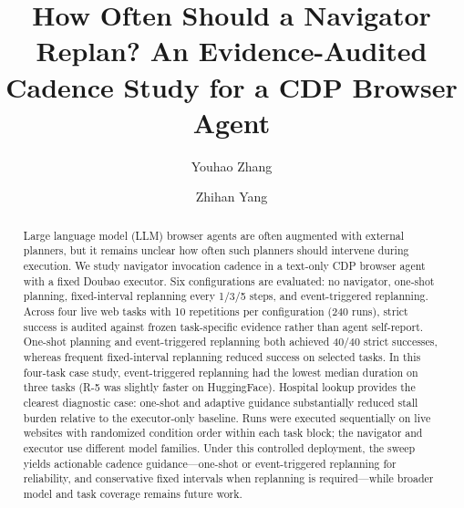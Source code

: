 \documentclass[runningheads]{llncs}
\begin{document}
\title{How Often Should a Navigator Replan? An Evidence-Audited Cadence Study for a CDP Browser Agent}

\author{Youhao Zhang  \and Zhihan Yang }


\maketitle

\begin{abstract}
Large language model (LLM) browser agents are often augmented with external
planners, but it remains unclear how often such planners should intervene during
execution. We study navigator invocation cadence in a text-only CDP browser
agent with a fixed Doubao executor. Six configurations are evaluated: no
navigator, one-shot planning, fixed-interval replanning every 1/3/5 steps, and
event-triggered replanning. Across four live web tasks with 10 repetitions per
configuration (240 runs), strict success is audited against frozen task-specific
evidence rather than agent self-report. One-shot planning and event-triggered
replanning both achieved 40/40 strict successes, whereas frequent
fixed-interval replanning reduced success on selected tasks. In this four-task
case study, event-triggered replanning had the lowest median duration on three
tasks (R-5 was slightly faster on HuggingFace). Hospital lookup provides the
clearest diagnostic case: one-shot and adaptive guidance substantially reduced
stall burden relative to the executor-only baseline. Runs were executed
sequentially on live websites with randomized condition order within each task
block; the navigator and executor use different model families. Under this
controlled deployment, the sweep yields actionable cadence guidance---one-shot
or event-triggered replanning for reliability, and conservative fixed intervals
when replanning is required---while broader model and task coverage remains
future work.
\end{abstract}
\end{document}
